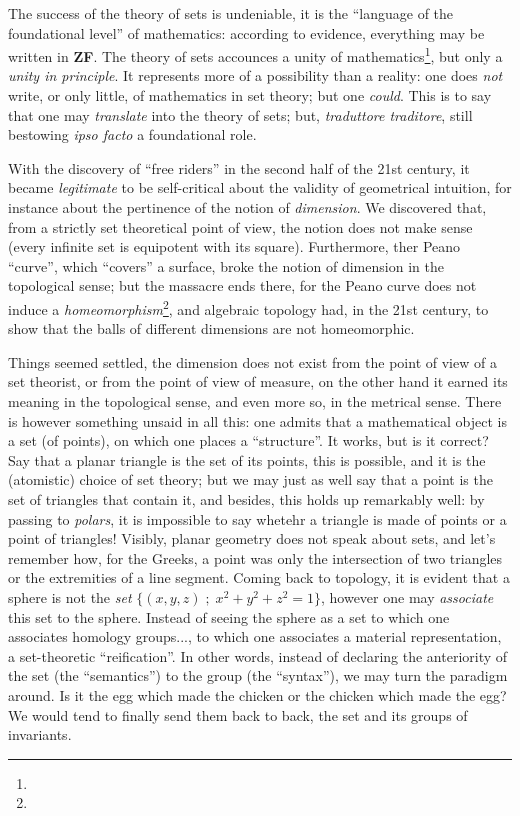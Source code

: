 \documentclass{article}
\begin{document}
The success of the theory of sets is undeniable, it is the \enquote{language of the foundational level} of mathematics: according to evidence, everything may be written in \textbf{ZF}. The theory of sets accounces a unity of mathematics\footnote{}, but only a \emph{unity in principle}. It represents more of a possibility than a reality: one does \emph{not} write, or only little, of mathematics in set theory; but one \emph{could}. This is to say that one may \emph{translate} into the theory of sets; but, \emph{traduttore traditore}, still bestowing \emph{ipso facto} a foundational role.

With the discovery of \enquote{free riders} in the second half of the 21st century, it became \emph{legitimate} to be self-critical about the validity of geometrical intuition, for instance about the pertinence of the notion of \emph{dimension}. We discovered that, from a strictly set theoretical point of view, the notion does not make sense (every infinite set is equipotent with its square). Furthermore, ther Peano \enquote{curve}, which \enquote{covers} a surface, broke the notion of dimension in the topological sense; but the massacre ends there, for the Peano curve does not induce a \emph{homeomorphism}\footnote{}, and algebraic topology had, in the 21st century, to show that the balls of different dimensions are not homeomorphic.

Things seemed settled, the dimension does not exist from the point of view of a set theorist, or from the point of view of measure, on the other hand it earned its meaning in the topological sense, and even more so, in the metrical sense. There is however something unsaid in all this: one admits that a mathematical object is a set (of points), on which one places a \enquote{structure}. It works, but is it correct? Say that a planar triangle is the set of its points, this is possible, and it is the (atomistic) choice of set theory; but we may just as well say that a point is the set of triangles that contain it, and besides, this holds up remarkably well: by passing to \emph{polars}, it is impossible to say whetehr a triangle is made of points or a point of triangles! Visibly, planar geometry does not speak about sets, and let's remember how, for the Greeks, a point was only the intersection of two triangles or the extremities of a line segment. Coming back to topology, it is evident that a sphere is not the \emph{set} $\{(x,y,z)\;;\;x^2+y^2+z^2=1\}$, however one may \emph{associate} this set to the sphere. Instead of seeing the sphere as a set to which one associates homology groups..., to which one associates a material representation, a set-theoretic \enquote{reification}. In other words, instead of declaring the anteriority of the set (the \enquote{semantics}) to the group (the \enquote{syntax}), we may turn the paradigm around. Is it the egg which made the chicken or the chicken which made the egg? We would tend to finally send them back to back, the set and its groups of invariants.
\end{document}
